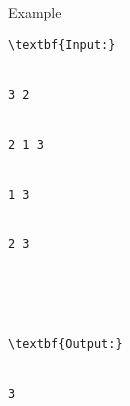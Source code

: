 Example
\begin{verbatim}
\textbf{Input:}


3 2


2 1 3


1 3


2 3





\textbf{Output:}


3\end{verbatim}